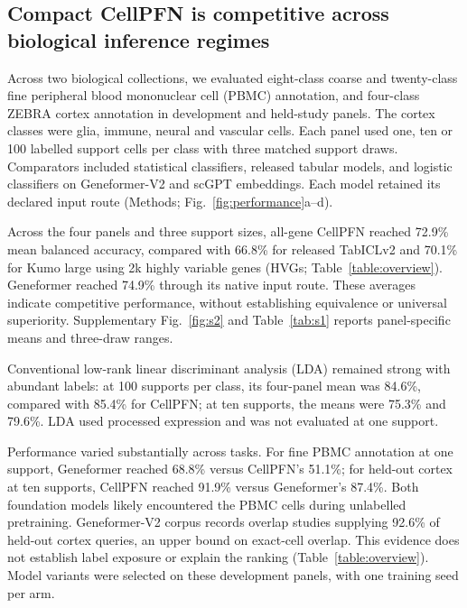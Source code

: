 \subsection*{Compact CellPFN is competitive across biological inference regimes}

Across two biological collections, we evaluated eight-class coarse and twenty-class fine peripheral blood mononuclear cell (PBMC) annotation\cite{hao2021multimodal}, and four-class ZEBRA cortex annotation in development and held-study panels\cite{flotho2024zebra}. The cortex classes were glia, immune, neural and vascular cells. Each panel used one, ten or 100 labelled support cells per class with three matched support draws. Comparators included statistical classifiers, released tabular models, and logistic classifiers on Geneformer-V2 and scGPT embeddings\cite{theodoris2023geneformer,chen2026geneformer,cui2024scgpt,qu2026tabiclv2,nvidia2026kumo,jaeger2026tabpfn35}. Each model retained its declared input route (Methods; Fig.~\ref{fig:performance}a--d).

Across the four panels and three support sizes, all-gene CellPFN reached 72.9\% mean balanced accuracy, compared with 66.8\% for released TabICLv2 and 70.1\% for Kumo large using 2k highly variable genes (HVGs; Table~\ref{table:overview}). Geneformer reached 74.9\% through its native input route. These averages indicate competitive performance, without establishing equivalence or universal superiority. Supplementary Fig.~\ref{fig:s2} and Table~\ref{tab:s1} reports panel-specific means and three-draw ranges.

Conventional low-rank linear discriminant analysis (LDA) remained strong with abundant labels: at 100 supports per class, its four-panel mean was 84.6\%, compared with 85.4\% for CellPFN; at ten supports, the means were 75.3\% and 79.6\%. LDA used processed expression and was not evaluated at one support.

Performance varied substantially across tasks. For fine PBMC annotation at one support, Geneformer reached 68.8\% versus CellPFN's 51.1\%; for held-out cortex at ten supports, CellPFN reached 91.9\% versus Geneformer's 87.4\%. Both foundation models likely encountered the PBMC cells during unlabelled pretraining. Geneformer-V2 corpus records overlap studies supplying 92.6\% of held-out cortex queries, an upper bound on exact-cell overlap. This evidence does not establish label exposure or explain the ranking (Table~\ref{table:overview}). Model variants were selected on these development panels, with one training seed per arm. 

